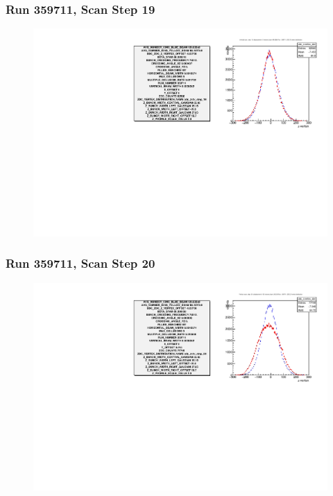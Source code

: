 \begin{frame}
\frametitle{Run 359711, Scan Step 19}
\begin{figure}
\begin{center}
\includegraphics[width=\linewidth]{"figs/359711_step_19_zdc_zvertex"}
\caption{ }
\label{fig:359711_step_19_zdc_zvertex}
\end{center}\end{figure}
\end{frame}

\begin{frame}
\frametitle{Run 359711, Scan Step 20}
\begin{figure}
\begin{center}
\includegraphics[width=\linewidth]{"figs/359711_step_20_zdc_zvertex"}
\caption{ }
\label{fig:359711_step_20_zdc_zvertex}
\end{center}\end{figure}
\end{frame}

